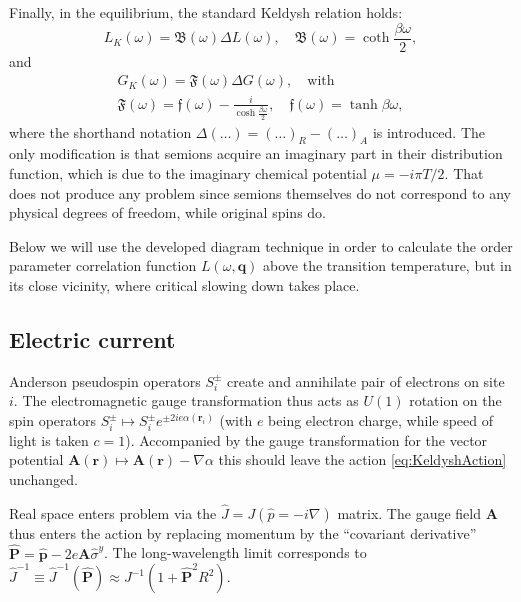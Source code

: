 \documentclass[twocolumn,english,prb]{revtex4-1}
\begin{document}
Finally, in the equilibrium, the standard Keldysh relation holds:
\begin{equation}
L_K(\omega) = \mathfrak{B}(\omega) \Delta L(\omega),\quad 
\mathfrak{B}(\omega)=\coth\frac{\beta\omega}{2},
\end{equation}
 and
\begin{multline}
\label{eq:SemionEquilibriumRelation}
G_K(\omega) = \mathfrak{F}(\omega) \Delta G(\omega),\quad \mathrm{with} \\
\mathfrak{F}(\omega) = \mathfrak{f}(\omega) - \frac{i}{\cosh \frac{\beta\omega}{2}},\quad \mathfrak{f}(\omega) = \tanh \beta \omega,
\end{multline}
where the shorthand notation $\Delta(\dots) = (\dots)_R - (\dots)_A$ is introduced. The only modification is that semions acquire an imaginary part in their distribution function, which is due to the imaginary chemical potential $\mu = -i \pi T / 2$. That does  not produce any problem since semions
themselves do not correspond to any physical degrees of freedom, while original spins do.

Below we will use the developed diagram technique in order to calculate the order parameter correlation function 
$L(\omega, \boldsymbol{q})$ above the transition temperature, but in its close vicinity, where critical slowing down takes place.


\subsection{Electric current}
Anderson pseudospin operators $S^{\pm}_{i}$ create and annihilate pair of electrons on site $i$. The electromagnetic gauge transformation thus acts as $U(1)$ rotation on the spin operators $S^{\pm}_i \mapsto S^{\pm}_i e^{\pm2 i e \alpha(\boldsymbol{r}_i)}$ (with $e$ being electron charge, while speed of light is taken $c = 1$). Accompanied by the gauge transformation for the vector potential $\boldsymbol{A}(\boldsymbol{r}) \mapsto \boldsymbol{A}(\boldsymbol{r}) - \nabla \alpha$ this should leave the action \eqref{eq:KeldyshAction} unchanged.

Real space enters problem via the $\hat{J} = J(\hat{p} = -i \nabla)$ matrix. The gauge field $\boldsymbol{A}$ thus enters the action by replacing momentum by the ``covariant derivative'' $\hat{\boldsymbol{P}}=\hat{\boldsymbol{p}}-2e\boldsymbol{A}\hat{\sigma}^{y}$. The long-wavelength limit corresponds to $\hat{J}^{-1} \equiv \hat{J}^{-1}(\hat{\boldsymbol{P}})\approx J^{-1} (1 + \hat{\boldsymbol{P}}^2 R^2)$.
\end{document}
